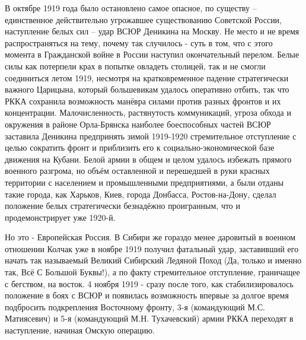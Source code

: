 В октябре 1919 года было остановлено самое опасное, по существу – единственное действительно угрожавшее существованию Советской России, наступление белых сил – удар ВСЮР Деникина на Москву. Не место и не время распространяться на тему, почему так случилось - суть в том, что с этого момента в Гражданской войне в России наступил окончательный перелом. Белые силы как потерпели крах в попытке овладеть столицей, так и не смогли соединиться летом 1919, несмотря на кратковременное падение стратегически важного Царицына, который большевикам удалось оперативно отбить, так что РККА сохранила возможность манёвра силами против разных фронтов и их концентрации. Малочисленность, растянутость коммуникаций, угроза обхода и окружения в районе Орла-Брянска наиболее боеспособных частей ВСЮР заставила Деникина предпринять зимой 1919-1920 стремительное отступление с целью сократить фронт и приблизить его к социально-экономической базе движения на Кубани. Белой армии в общем и целом удалось избежать прямого военного разгрома, но объём оставленной и перешедшей в руки красных территории с населением и промышленными предприятиями, а были отданы такие города, как Харьков, Киев, города Донбасса, Ростов-на-Дону, сделал положение белых стратегически безнадёжно проигранным, что и продемонстрирует уже 1920-й.

Но это - Европейская Россия. В Сибири же гораздо менее даровитый в военном отношении Колчак уже в ноябре 1919 получил фатальный удар, заставивший его начать так называемый Великий Сибирский Ледяной Поход (Да, только и именно так, Всё С Большой Буквы!), а по факту стремительное отступление, граничащее с бегством, на восток. 4 ноября 1919 - сразу после того, как стабилизировалось положение в боях с ВСЮР и появилась возможность впервые за долгое время подбросить подкрепления Восточному фронту, 3-я (командующий М.С. Матиясевич) и 5-я (командующий М.Н. Тухачевский) армии РККА переходят в наступление, начиная Омскую операцию. 

